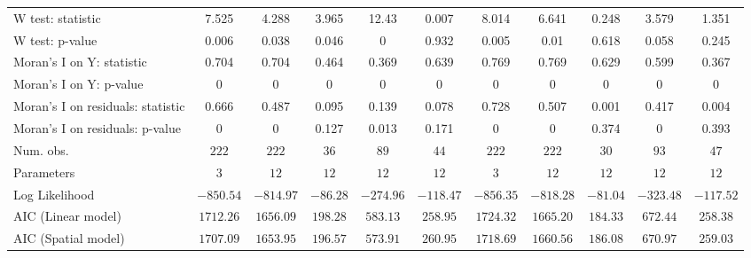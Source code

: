\begin{table}
\begin{center}
\begin{tabular}{l c c c c c c c c c c}
W test: statistic                 & 7.525         & 4.288         & 3.965         & 12.43         & 0.007          & 8.014         & 6.641         & 0.248         & 3.579         & 1.351          \\
W test: p-value                   & 0.006         & 0.038         & 0.046         & 0             & 0.932          & 0.005         & 0.01          & 0.618         & 0.058         & 0.245          \\
Moran's I on Y: statistic         & 0.704         & 0.704         & 0.464         & 0.369         & 0.639          & 0.769         & 0.769         & 0.629         & 0.599         & 0.367          \\
Moran's I on Y: p-value           & 0             & 0             & 0             & 0             & 0              & 0             & 0             & 0             & 0             & 0              \\
Moran's I on residuals: statistic & 0.666         & 0.487         & 0.095         & 0.139         & 0.078          & 0.728         & 0.507         & 0.001         & 0.417         & 0.004          \\
Moran's I on residuals: p-value   & 0             & 0             & 0.127         & 0.013         & 0.171          & 0             & 0             & 0.374         & 0             & 0.393          \\
Num. obs.                         & $222$         & $222$         & $36$          & $89$          & $44$           & $222$         & $222$         & $30$          & $93$          & $47$           \\
Parameters                        & $3$           & $12$          & $12$          & $12$          & $12$           & $3$           & $12$          & $12$          & $12$          & $12$           \\
Log Likelihood                    & $-850.54$     & $-814.97$     & $-86.28$      & $-274.96$     & $-118.47$      & $-856.35$     & $-818.28$     & $-81.04$      & $-323.48$     & $-117.52$      \\
AIC (Linear model)                & $1712.26$     & $1656.09$     & $198.28$      & $583.13$      & $258.95$       & $1724.32$     & $1665.20$     & $184.33$      & $672.44$      & $258.38$       \\
AIC (Spatial model)               & $1707.09$     & $1653.95$     & $196.57$      & $573.91$      & $260.95$       & $1718.69$     & $1660.56$     & $186.08$      & $670.97$      & $259.03$       \\

\end{tabular}
\end{center}
\end{table}
